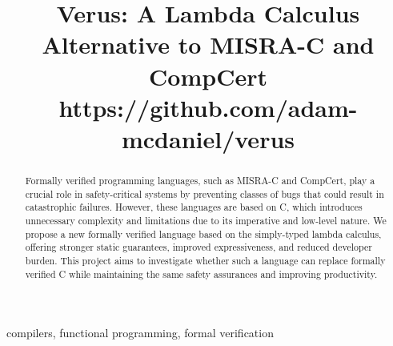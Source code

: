 \documentclass[conference]{IEEEtran}
\begin{document}
\title{Verus: A Lambda Calculus Alternative to MISRA-C and CompCert\\
{\footnotesize https://github.com/adam-mcdaniel/verus}}

\author{
\and
{}
\and
{}
\and
{}
}

\maketitle

\begin{abstract}
Formally verified programming languages, such as MISRA-C and CompCert, play a crucial role in safety-critical systems by preventing classes of bugs that could result in catastrophic failures. However, these languages are based on C, which introduces unnecessary complexity and limitations due to its imperative and low-level nature. We propose a new formally verified language based on the simply-typed lambda calculus, offering stronger static guarantees, improved expressiveness, and reduced developer burden. This project aims to investigate whether such a language can replace formally verified C while maintaining the same safety assurances and improving productivity.
\end{abstract}

\begin{IEEEkeywords}
compilers, functional programming, formal verification
\end{IEEEkeywords}
\end{document}
